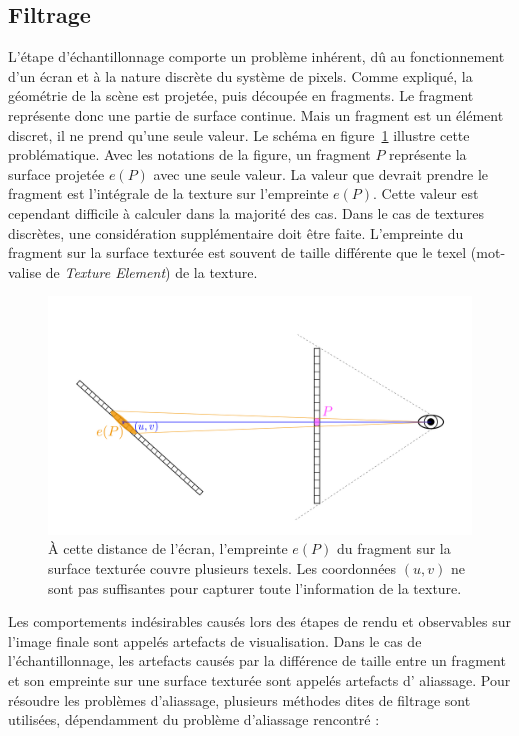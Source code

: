 \subsection*{Filtrage}
\label{subsec:filtering}

L'étape d'échantillonnage comporte un problème inhérent, dû au fonctionnement d'un écran et à la nature discrète du système de pixels. Comme expliqué, la géométrie de la scène est projetée, puis découpée en fragments. Le fragment représente donc une partie de surface continue. Mais un fragment est un élément discret, il ne prend qu'une seule valeur. Le schéma en figure~\ref{fig:aliasing} illustre cette problématique. Avec les notations de la figure, un fragment $P$ représente la surface projetée $e(P)$ avec une seule valeur. La valeur que devrait prendre le fragment est l'intégrale de la texture sur l'empreinte $e(P)$. Cette valeur est cependant difficile à calculer dans la majorité des cas. Dans le cas de textures discrètes, une considération supplémentaire doit être faite. L'empreinte du fragment sur la surface texturée est souvent de taille différente que le texel (mot-valise de \textit{Texture Element}) de la texture.

\bigskip

\begin{figure}
    \centering
    \includegraphics[width=\textwidth]{contenu/resources/images/schema_filtrage}
    \caption[Visualisation du problème d'échantillonnage lors du rendu par rastérisation]{À cette distance de l'écran, l'empreinte $e(P)$ du fragment sur la surface texturée couvre plusieurs texels. Les coordonnées $(u, v)$ ne sont pas suffisantes pour capturer toute l'information de la texture.}
    \label{fig:aliasing}
\end{figure}

Les comportements indésirables causés lors des étapes de rendu et observables sur l'image finale sont appelés artefacts de visualisation. Dans le cas de l'échantillonnage, les artefacts causés par la différence de taille entre un fragment et son empreinte sur une surface texturée sont appelés artefacts d' aliassage. Pour résoudre les problèmes d'aliassage, plusieurs méthodes dites de filtrage sont utilisées, dépendamment du problème d'aliassage rencontré :

